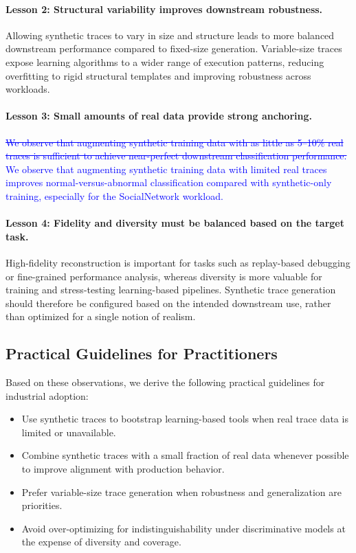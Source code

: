 \documentclass[sigconf,review]{acmart}
\begin{document}
\paragraph{Lesson 2: Structural variability improves downstream robustness.}
Allowing synthetic traces to vary in size and structure leads to more balanced downstream performance compared to fixed-size generation. Variable-size traces expose learning algorithms to a wider range of execution patterns, reducing overfitting to rigid structural templates and improving robustness across workloads.

\paragraph{Lesson 3: Small amounts of real data provide strong anchoring.}
\textcolor{blue}{\sout{We observe that augmenting synthetic training data with as little as 5--10\% real traces is sufficient to achieve near-perfect downstream classification performance.}}
\textcolor{blue}{We observe that augmenting synthetic training data with limited real traces improves normal-versus-abnormal classification compared with synthetic-only training, especially for the SocialNetwork workload.}


\paragraph{Lesson 4: Fidelity and diversity must be balanced based on the target task.}
High-fidelity reconstruction is important for tasks such as replay-based debugging or fine-grained performance analysis, whereas diversity is more valuable for training and stress-testing learning-based pipelines. Synthetic trace generation should therefore be configured based on the intended downstream use, rather than optimized for a single notion of realism.

\subsection{Practical Guidelines for Practitioners}

Based on these observations, we derive the following practical guidelines for industrial adoption:

\begin{itemize}
    \item Use synthetic traces to bootstrap learning-based tools when real trace data is limited or unavailable.
    \item Combine synthetic traces with a small fraction of real data whenever possible to improve alignment with production behavior.
    \item Prefer variable-size trace generation when robustness and generalization are priorities.
    \item Avoid over-optimizing for indistinguishability under discriminative models at the expense of diversity and coverage.
\end{itemize}
\end{document}
